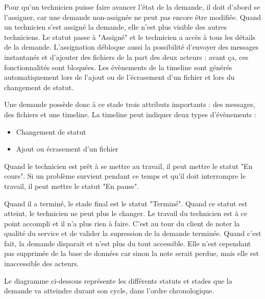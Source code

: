 \documentclass[
    iai, %
    eai, %
]{heig-tb}
\begin{document}
Pour qu'un technicien puisse faire avancer l'état de la demande, il doit d'abord se l'assigner, car une demande non-assignée ne peut pas encore être modifiée.
Quand un technicien s'est assigné la demande, elle n'est plus visible des autres techniciens. Le statut passe à "Assigné" et le technicien a accès à tous les détails de la demande.
L'assignation débloque aussi la possibilité d'envoyer des messages instantanés et d'ajouter des fichiers de la part des deux acteurs : avant ça, ces fonctionnalités sont bloquées.
Les évènements de la timeline sont générés automatiquement lors de l'ajout ou de l'écrasement d'un fichier et lors du changement de statut.

Une demande possède donc à ce stade trois attributs importants : des messages, des fichiers et une timeline.
La timeline peut indiquer deux types d'évènements :
\begin{itemize}
  \item Changement de statut
  \item Ajout ou écrasement d'un fichier
\end{itemize}

\newpage
Quand le technicien est prêt à se mettre au travail, il peut mettre le statut "En cours". Si un problème survient pendant ce temps et qu'il doit interrompre le travail, il peut mettre le statut "En pause".

Quand il a terminé, le stade final est le statut "Terminé". Quand ce statut est atteint, le technicien ne peut plus le changer. Le travail du technicien est à ce point accompli et il n'a plus rien à faire. C'est au tour du client de noter la qualité du service et de valider la supression de la demande terminée. Quand c'est fait, la demande disparait et n'est plus du tout accessible. Elle n'est cependant pas supprimée de la base de données car sinon la note serait perdue, mais elle est inaccessible des acteurs.

Le diagramme ci-dessous représente les différents statuts et stades que la demande va atteindre durant son cycle, dans l'ordre chronologique.

\end{document}
